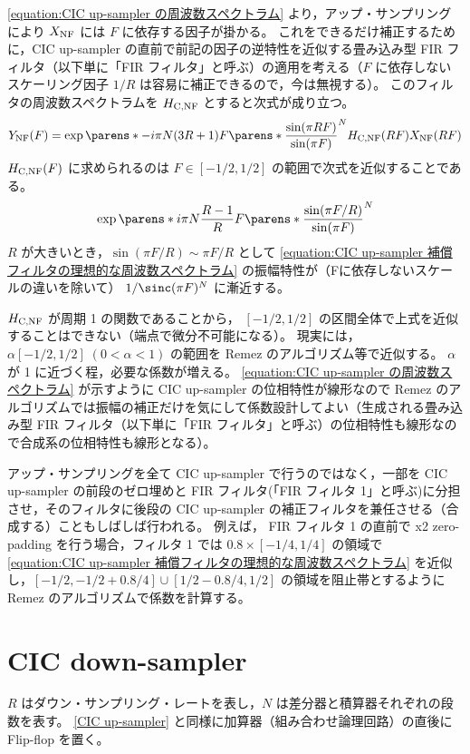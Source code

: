         \cref{equation:CIC up-sampler の周波数スペクトラム} より，アップ・サンプリングにより $X_\text{NF}$ には $F$ に依存する因子が掛かる。
        これをできるだけ補正するために，CIC up-sampler の直前で前記の因子の逆特性を近似する畳み込み型 FIR フィルタ（以下単に「FIR フィルタ」と呼ぶ）の適用を考える（$F$ に依存しないスケーリング因子 $1/R$ は容易に補正できるので，今は無視する）。
        このフィルタの周波数スペクトラムを $H_\text{C,NF}$ とすると次式が成り立つ。
        \[ \YNF(F) = \exp\parens*{-i\pi N(3R+1)F}\parens*{\frac{\sin(\pi R F)}{\sin(\pi F)}}^N \HCNF(R F)\XNF(R F) \]
        $H_\text{C,NF}(F)$ に求められるのは $F \in [-1/2,1/2]$ の範囲で次式を近似することである。
        \begin{equation}
            \exp\parens*{i\pi N\frac{R-1}{R}F}\parens*{\frac{\sin(\pi F/R)}{\sin(\pi F)}}^N \label{equation:CIC up-sampler 補償フィルタの理想的な周波数スペクトラム}
        \end{equation}
        $R$ が大きいとき，$\sin(\pi F/R) \sim \pi F/R$ として \cref{equation:CIC up-sampler 補償フィルタの理想的な周波数スペクトラム} の振幅特性が（Fに依存しないスケールの違いを除いて） $1/\sinc(\pi F)^N$ に漸近する。
        \par
        $H_\text{C,NF}$ が周期 1 の関数であることから， $[-1/2,1/2]$ の区間全体で上式を近似することはできない（端点で微分不可能になる）。
        現実には，$\alpha[-1/2,1/2]\;(0<\alpha<1)$ の範囲を Remez のアルゴリズム等で近似する。
        $\alpha$ が 1 に近づく程，必要な係数が増える。
        \cref{equation:CIC up-sampler の周波数スペクトラム} が示すように CIC up-sampler の位相特性が線形なので Remez のアルゴリズムでは振幅の補正だけを気にして係数設計してよい（生成される畳み込み型 FIR フィルタ（以下単に「FIR フィルタ」と呼ぶ）の位相特性も線形なので合成系の位相特性も線形となる）。
        \par
        アップ・サンプリングを全て CIC up-sampler で行うのではなく，一部を CIC up-sampler の前段のゼロ埋めと FIR フィルタ(「FIR フィルタ 1」と呼ぶ)に分担させ，そのフィルタに後段の CIC up-sampler の補正フィルタを兼任させる（合成する）こともしばしば行われる。
        例えば， FIR フィルタ 1 の直前で x2 zero-padding を行う場合，フィルタ 1 では $0.8\times[-1/4,1/4]$ の領域で \cref{equation:CIC up-sampler 補償フィルタの理想的な周波数スペクトラム} を近似し，$[-1/2,-1/2+0.8/4]\cup[1/2-0.8/4,1/2]$ の領域を阻止帯とするように Remez のアルゴリズムで係数を計算する。
\section{CIC down-sampler}
    $R$ はダウン・サンプリング・レートを表し，$N$ は差分器と積算器それぞれの段数を表す。
    \ref{CIC up-sampler} と同様に加算器（組み合わせ論理回路）の直後に Flip-flop を置く。
